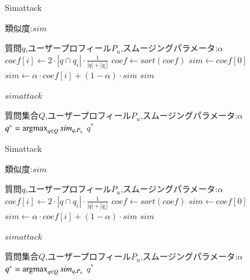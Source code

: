 \documentclass[14pt,xcolor=dvipsnames,table,dvipdfmx]{beamer}
\newcommand{\argmax}{\operatornamewithlimits{argmax}}
\begin{document}
\begin{frame}{Simattack}
\fontsize{12pt}{7.2}\selectfont
	\begin{block}{類似度:$sim$}
	\begin{algorithmic}[1]
		\REQUIRE 質問$q$,ユーザープロフィール$P_u$,スムージングパラメータ:$\alpha$
		\STATE $coef[i] \leftarrow 2 \cdot |q \cap q_i| \cdot \frac{1}{|q|+|q_i|}$
		\ENDFOR
		\STATE $coef \gets sort(coef)$
		\STATE $sim \gets coef[0]$
		\STATE $sim \gets \alpha \cdot coef[i] + (1 - \alpha) \cdot sim$
		\ENDFOR
		\ENSURE $sim$
	\end{algorithmic}
	\end{block}
	\begin{block}{$simattack$}
	\begin{algorithmic}[1]
		\REQUIRE 質問集合$Q$,ユーザープロフィール$P_u$,スムージングパラメータ:$\alpha$
		\STATE $q^* = \argmax_{q \in Q}sim_{q,P_u}$
		\ENSURE $q^*$
	\end{algorithmic}
	\end{block}
\end{frame}

\begin{frame}{Simattack}
\fontsize{12pt}{7.2}\selectfont
	\begin{block}{類似度:$sim$}
	\begin{algorithmic}[1]
		\REQUIRE 質問$q$,ユーザープロフィール$P_u$,スムージングパラメータ:$\alpha$
		\STATE $coef[i] \leftarrow 2 \cdot |q \cap q_i| \cdot \frac{1}{|q|+|q_i|}$
		\ENDFOR
		\STATE $coef \gets sort(coef)$
		\STATE $sim \gets coef[0]$
		\STATE $sim \gets \alpha \cdot coef[i] + (1 - \alpha) \cdot sim$
		\ENDFOR
		\ENSURE $sim$
	\end{algorithmic}
	\end{block}
	\begin{block}{$simattack$}
	\begin{algorithmic}[1]
		\REQUIRE 質問集合$Q$,ユーザープロフィール$P_u$,スムージングパラメータ:$\alpha$
		\STATE $q^* = \argmax_{q \in Q}sim_{q,P_u}$
		\ENSURE $q^*$
	\end{algorithmic}
	\end{block}
\end{frame}
\end{document}
